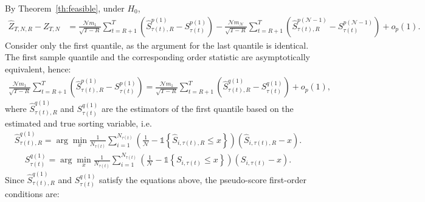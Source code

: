 By Theorem~\ref{th:feasible}, under $H_0$,
\begin{align*}
\widehat{Z}_{T,N,R}-Z_{T,N}
&= \frac{\mathcal{N}m_{1}}{\sqrt{T-R}}\sum_{t=R+1}^{T}\left( \widehat{S}_{\tau(t),R}^{p(1)}-S_{\tau(t)}^{p(1)}\right)
-\frac{\mathcal{N}m_{\mathcal{N}}}{\sqrt{T-R}}\sum_{t=R+1}^{T}\left( \widehat{S}_{\tau(t),R}^{p(\mathcal{N}-1)}-S_{\tau(t)}^{p(\mathcal{N}-1)}\right)+o_p(1).
\end{align*}
Consider only the first quantile, as the argument for the last quantile is identical. The first sample quantile and the corresponding order statistic are asymptotically equivalent, hence:
\begin{align*}
\frac{\mathcal{N}m_{1}}{\sqrt{T-R}}\sum_{t=R+1}^{T}\left( \widehat{S}_{\tau(t),R}^{p(1)}-S_{\tau(t)}^{p(1)}\right)
=\frac{\mathcal{N}m_{1}}{\sqrt{T-R}}\sum_{t=R+1}^{T} \left( \widehat{S}_{\tau(t),R}^{q(1)}-S_{\tau(t)}^{q(1)} \right)+o_p(1),
\end{align*}
where $\widehat{S}_{\tau(t),R}^{q(1)}$ and $S_{\tau(t)}^{q(1)}$ are the estimators of the first quantile based on the estimated and true sorting variable, i.e.
\begin{align*}
\widehat{S}_{\tau(t),R}^{q(1)}=\arg\min_{x}\frac{1}{N_{\tau(t)}}\sum_{i=1}^{N_{\tau(t)}}\left( \frac{1}{\mathcal{N}}-\mathds{1}\left\{ \widehat{S}_{i,\tau(t),R}\leq x\right\} \right)\left( \widehat{S}_{i,\tau(t),R}-x\right).
\end{align*}
\begin{align*}
S_{\tau(t)}^{q(1)}=\arg\min_{x}\frac{1}{N_{\tau(t)}}\sum_{i=1}^{N_{\tau(t)}}\left( \frac{1}{\mathcal{N}}-\mathds{1}\left\{ S_{i,\tau(t)}\leq x\right\} \right)\left( S_{i,\tau(t)}-x\right).
\end{align*}
Since $\widehat{S}_{\tau(t),R}^{q(1)}$ and $S_{\tau(t)}^{q(1)}$ satisfy the equations above, the pseudo-score first-order conditions are:
